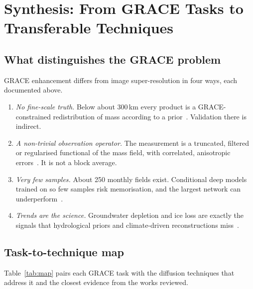 \section{Synthesis: From GRACE Tasks to Transferable Techniques}
\label{sec:synthesis}

\subsection{What distinguishes the GRACE problem}

GRACE enhancement differs from image super-resolution in four ways, each documented above.
\begin{enumerate}
  \item \emph{No fine-scale truth.} Below about 300\,km every product is a GRACE-constrained redistribution of mass according to a prior~\cite{xiong2026sysu,goracci2026nggm}. Validation there is indirect.
  \item \emph{A non-trivial observation operator.} The measurement is a truncated, filtered or regularised functional of the mass field, with correlated, anisotropic errors~\cite{kusche2007approximate,loomis2019regularization,boergens2020covariance}. It is not a block average.
  \item \emph{Very few samples.} About 250 monthly fields exist. Conditional deep models trained on so few samples risk memorisation, and the largest network can underperform~\cite{he2021deep}.
  \item \emph{Trends are the science.} Groundwater depletion and ice loss are exactly the signals that hydrological priors and climate-driven reconstructions miss~\cite{springer2026review,humphrey2019gracerec,zhang2026groundwater}.
\end{enumerate}

\subsection{Task-to-technique map}

Table~\ref{tab:map} pairs each GRACE task with the diffusion techniques that address it and the closest evidence from the works reviewed.

